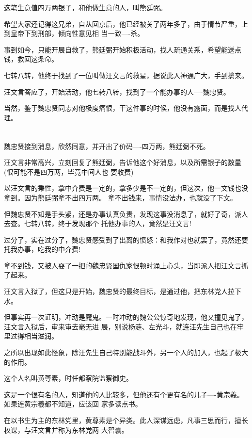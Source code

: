\documentclass[11pt,a4paper,onecolumn]{article}
\begin{document}
这笔生意值四万两银子，和他做生意的人，叫熊廷弼。

希望大家还记得这兄弟，自从回京后，他已经被关了两年多了，由于情节严重，上到皇帝下到刑部，倾向性意见相
当一致----杀。

事到如今，只能开展自救了，熊廷弼开始积极活动，找人疏通关系，希望能送点钱，救回这条命。

七转八转，他终于找到了一位叫做汪文言的救星，据说此人神通广大，手到擒来。

汪文言答应了，开始活动，他七转八转，找到了一个能办事的人----魏忠贤。

当然，鉴于魏忠贤同志对他极度痛恨，干这件事的时候，他没有露面，而是找人代理。

\section[\thesection]{}

魏忠贤接到消息，欣然同意，并开出了价码----四万两，熊廷弼不死。

汪文言非常高兴，立刻回复了熊廷弼，告诉他这个好消息，以及所需银子的数量(很可能不是四万两，毕竟中间人也
要收费)

以汪文言的秉性，拿中介费是一定的，拿多少是不一定的，但这次，他一文钱也没拿到。因为熊廷弼拿不出四万两。
拿不出钱来，事情没法办，也就没了下文。

但魏忠贤不知是手头紧，还是办事认真负责，发现这事没消息了，就好了奇，派人去查。七转八转，终于发现那个
托他办事的人，竟然是汪文言!

过分了，实在过分了，魏忠贤感受到了出离的愤怒：和我作对也就罢了，竟然还要托我办事，吃我的中介费!

拿不到钱，又被人耍了一把的魏忠贤国仇家恨顿时涌上心头，当即派人把汪文言抓了起来。

汪文言入狱了，但这只是开始，魏忠贤的最终目标，是通过他，把东林党人拉下水。

但事实再一次证明，冲动是魔鬼。一时冲动的魏公公惊奇地发现，他又撞见鬼了，汪文言入狱后，审来审去毫无进
展，别说杨涟、左光斗，就连汪先生自己也在牢里过得相当滋润。

之所以出现如此怪象，除汪先生自己特别能战斗外，另一个人的加入，也起了极大的作用。

这个人名叫黄尊素，时任都察院监察御史。

这是一个很有名的人，知道他的人比较多，但他还有个更有名的儿子----黄宗羲。如果连黄宗羲都不知道，应该回
家多读点书。

在以书生为主的东林党里，黄尊素是个异类。此人深谋远虑，凡事三思而行，擅长权谋，与汪文言并称为东林党两
大智囊。
\end{document}
